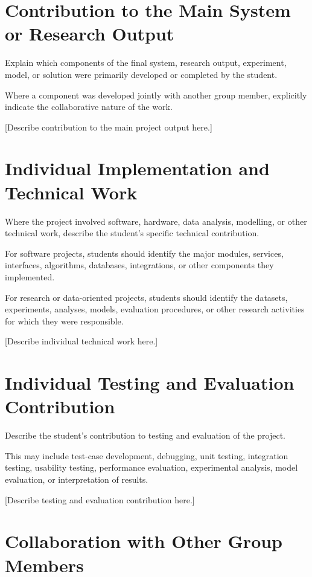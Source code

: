 \documentclass[12pt,a4paper]{report}
\begin{document}
\section{Contribution to the Main System or Research Output}

Explain which components of the final system, research output, experiment, model, or solution were primarily developed or completed by the student.

Where a component was developed jointly with another group member, explicitly indicate the collaborative nature of the work.

[Describe contribution to the main project output here.]

\section{Individual Implementation and Technical Work}

Where the project involved software, hardware, data analysis, modelling, or other technical work, describe the student's specific technical contribution.

For software projects, students should identify the major modules, services, interfaces, algorithms, databases, integrations, or other components they implemented.

For research or data-oriented projects, students should identify the datasets, experiments, analyses, models, evaluation procedures, or other research activities for which they were responsible.

[Describe individual technical work here.]

\section{Individual Testing and Evaluation Contribution}

Describe the student's contribution to testing and evaluation of the project.

This may include test-case development, debugging, unit testing, integration testing, usability testing, performance evaluation, experimental analysis, model evaluation, or interpretation of results.

[Describe testing and evaluation contribution here.]

\section{Collaboration with Other Group Members}
\end{document}
